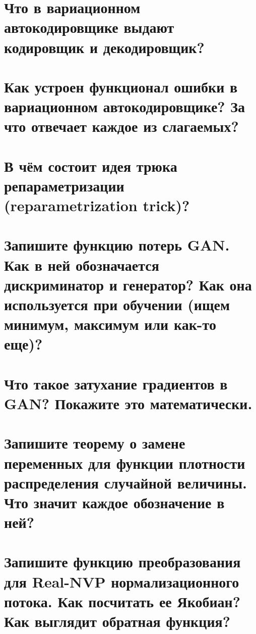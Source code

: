 \documentclass[14pt]{extarticle}
\begin{document}
	\newpage
	\section{Что в вариационном автокодировщике выдают кодировщик и декодировщик?} 
	
	
	\newpage
	\section{Как устроен функционал ошибки в вариационном автокодировщике? За что отвечает каждое из слагаемых?} %
	
	
	\newpage
	\section{В чём состоит идея трюка репараметризации (reparametrization trick)?} %
	
	
	\newpage
	\section{Запишите функцию потерь GAN. Как в ней обозначается дискриминатор и генератор? Как она используется при обучении (ищем минимум, максимум или как-то еще)?} %
	
	
	\newpage
	\section{Что такое затухание градиентов в GAN? Покажите это математически.} %
	
	
	\newpage
	
	\section{Запишите теорему о замене переменных для функции плотности распределения случайной величины. Что значит каждое обозначение в ней?} %
	
	
	\newpage
	
	\section{Запишите функцию преобразования для Real-NVP нормализационного потока. Как посчитать ее Якобиан? Как выглядит обратная функция?} %
	
	
	\newpage
	
\end{document}
